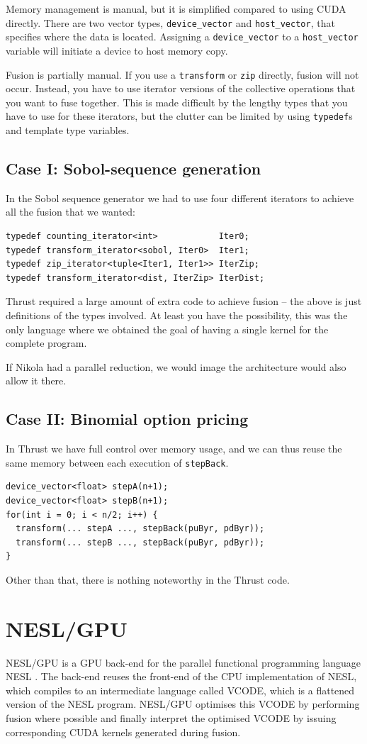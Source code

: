 \documentclass[preprint]{sigplanconf}
\begin{document}
Memory management is manual, but it is simplified compared to using
CUDA directly. There are two vector types, \verb|device_vector| and
\verb|host_vector|, that specifies where the data is
located. Assigning a \verb|device_vector| to a \verb|host_vector|
variable will initiate a device to host memory copy.

Fusion is partially manual. If you use a \verb|transform| or
\verb|zip| directly, fusion will not occur. Instead, you have to use
iterator versions of the collective operations that you want to fuse
together. This is made difficult by the lengthy types that you have to
use for these iterators, but the clutter can be limited by using
\verb|typedef|s and template type variables.

\subsection{Case I: Sobol-sequence generation}
In the Sobol sequence generator we had to use four different iterators
to achieve all the fusion that we wanted:
\begin{verbatim}
typedef counting_iterator<int>            Iter0;
typedef transform_iterator<sobol, Iter0>  Iter1;
typedef zip_iterator<tuple<Iter1, Iter1>> IterZip;
typedef transform_iterator<dist, IterZip> IterDist;
\end{verbatim}
Thrust required a large amount of extra code to achieve fusion -- the
above is just definitions of the types involved. At least you have
the possibility, this was the only language where we obtained the goal
of having a single kernel for the complete program.

If Nikola had a parallel reduction, we would image the architecture
would also allow it there.

\subsection{Case II: Binomial option pricing}
In Thrust we have full control over memory usage, and we can thus
reuse the same memory between each execution of \verb|stepBack|. 
\begin{verbatim}
device_vector<float> stepA(n+1);
device_vector<float> stepB(n+1);
for(int i = 0; i < n/2; i++) {
  transform(... stepA ..., stepBack(puByr, pdByr));
  transform(... stepB ..., stepBack(puByr, pdByr));
}
\end{verbatim}
Other than that, there is nothing noteworthy in the Thrust code.

\section{NESL/GPU}
NESL/GPU is a GPU back-end for the parallel functional programming
language NESL \cite{nesl}. The back-end reuses the front-end of the
CPU implementation of NESL, which compiles to an intermediate language
called VCODE, which is a flattened version of the NESL
program. NESL/GPU optimises this VCODE by performing fusion where
possible and finally interpret the optimised VCODE by issuing
corresponding CUDA kernels generated during fusion.
\end{document}
